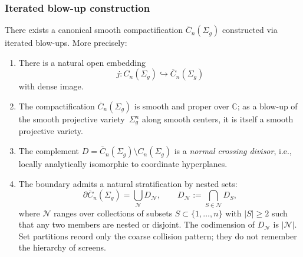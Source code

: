 \subsubsection{Iterated blow-up construction}

\begin{theorem}\label{thm:FM}
There exists a canonical smooth compactification $\overline{C}_n(\Sigma_g)$ constructed via iterated blow-ups. More precisely:

\begin{enumerate}
\item There is a natural open embedding
\[j: C_n(\Sigma_g) \hookrightarrow \overline{C}_n(\Sigma_g)\]
with dense image.

\item The compactification $\overline{C}_n(\Sigma_g)$ is smooth and proper over $\mathbb{C}$; as a blow-up of the smooth projective variety~$\Sigma_g^n$ along smooth centers, it is itself a smooth projective variety.

\item The complement $D = \overline{C}_n(\Sigma_g) \setminus C_n(\Sigma_g)$ is a \emph{normal crossing divisor}, i.e., locally analytically isomorphic to coordinate hyperplanes.

\item The boundary admits a natural stratification by nested sets:
\[
\partial\overline{C}_n(\Sigma_g)
=
\bigcup_{\mathcal N} D_{\mathcal N},
\qquad
D_{\mathcal N}:=\bigcap_{S\in\mathcal N}D_S ,
\]
where $\mathcal N$ ranges over collections of subsets
$S\subset\{1,\ldots,n\}$ with $|S|\geq2$ such that any two members are
nested or disjoint. The codimension of $D_{\mathcal N}$ is
$|\mathcal N|$. Set partitions record only the coarse collision pattern;
they do not remember the hierarchy of screens.


\end{enumerate}
\end{theorem}
